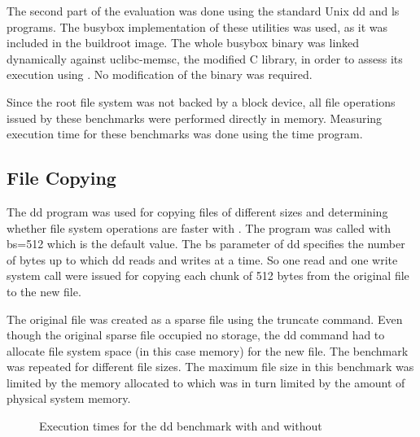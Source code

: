 The second part of the evaluation was done using the standard Unix dd and ls
programs. The busybox \cite{busybox} implementation of these utilities was
used, as it was included in the buildroot image. The whole busybox binary was
linked dynamically against uclibc-memsc, the modified C library, in order to
assess its execution using \memsc. No modification of the binary was required.

Since the root file system was not backed by a block device, all file
operations issued by these benchmarks were performed directly in memory.
Measuring execution time for these benchmarks was done using the time program.

\subsection{File Copying}

The dd program was used for copying files of different sizes and determining
whether file system operations are faster with \memsc. The program was called
with bs=512 which is the default value. The bs parameter of dd specifies the
number of bytes up to which dd reads and writes at a time. So one read and one
write system call were issued for copying each chunk of 512 bytes from the
original file to the new file.

The original file was created as a sparse file using the truncate command. Even
though the original sparse file occupied no storage, the dd command had to
allocate file system space (in this case memory) for the new file. The
benchmark was repeated for different file sizes. The maximum file size in this
benchmark was limited by the memory allocated to \llinux which was in turn
limited by the amount of physical system memory.

\break

\newcommand{\Ia}{1.43}
\newcommand{\Ib}{7.03}
\newcommand{\Ic}{14.02}
\newcommand{\Id}{20.87}
\newcommand{\Ie}{27.88}

\newcommand{\Ja}{0.83}
\newcommand{\Jb}{3.98}
\newcommand{\Jc}{7.95}
\newcommand{\Jd}{11.9}
\newcommand{\Je}{15.81}

\begin{figure}[h!]
\caption{Execution times for the dd benchmark with and without \memsc}
\label{fig:dd}
\end{figure}

